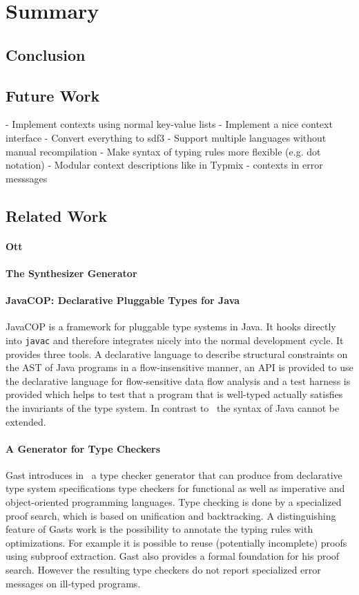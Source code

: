 \chapter{Summary}
\section{Conclusion}
\section{Future Work}
- Implement contexts using normal key-value lists
- Implement a nice context interface
- Convert everything to sdf3
- Support multiple languages without manual recompilation
- Make syntax of typing rules more flexible (e.g. dot notation)
- Modular context descriptions like in Typmix
- contexts in error messsages
\section{Related Work}
\subsubsection{Ott}
\subsubsection{The Synthesizer Generator}
\subsubsection{JavaCOP: Declarative Pluggable Types for Java}
JavaCOP \cite{Markstrum:2010:JDP:1667048.1667049} is a framework for
pluggable type systems in Java. It hooks directly into \verb|javac|
and therefore integrates nicely into the normal development cycle. It
provides three tools. A declarative language to describe structural
constraints on the AST of Java programs in a flow-insensitive
manner, an API is provided to use the declarative language for
flow-sensitive data flow analysis and a test harness is provided which
helps to test that a program that is well-typed actually satisfies the
invariants of the type system. In contrast to~\cite{bergan2007typmix}
the syntax of Java cannot be extended.

\subsubsection{A Generator for Type Checkers}
Gast introduces in~\cite{gast2005generator} a type checker generator
that can produce from declarative type system specifications type
checkers for functional as well as imperative and object-oriented
programming languages. Type checking is done by a specialized proof
search, which is based on unification and backtracking. A
distinguishing feature of Gasts work is the possibility to annotate
the typing rules with optimizations. For example it is possible to
reuse (potentially incomplete) proofs using subproof extraction. Gast
also provides a formal foundation for his proof search. However the
resulting type checkers do not report specialized error messages on
ill-typed  programs.

